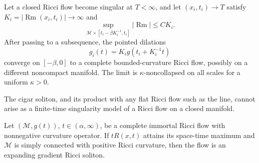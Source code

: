 \begin{corollary}
\label{cor:chow-ii-appd-obtaining-singularity-models}
Let a closed Ricci flow become singular at $T<\infty$, and let
$(x_i,t_i)\to T$ satisfy $K_i=|\operatorname{Rm}(x_i,t_i)|\to\infty$ and
\[
 \sup_{\mathcal M\times[t_i-\beta K_i^{-1},t_i]}
 |\operatorname{Rm}|\leq CK_i.
\]
After passing to a subsequence, the pointed dilations
\[
 g_i(t)=K_i g(t_i+K_i^{-1}t)
\]
converge on $[-\beta,0]$ to a complete bounded-curvature Ricci flow, possibly
on a different noncompact manifold. The limit is $\kappa$-noncollapsed on all
scales for a uniform $\kappa>0$.
\end{corollary}

\begin{corollary}
\label{cor:chow-ii-appd-cigar-not-singularity-model}
The cigar soliton, and its product with any flat Ricci flow such as the line,
cannot arise as a finite-time singularity model of a Ricci flow on a closed
manifold.
\end{corollary}

\begin{theorem}
\label{thm:chow-ii-appd-immortal-expanding-soliton}
Let $(\mathcal M,g(t))$, $t\in(\alpha,\infty)$, be a complete immortal Ricci
flow with nonnegative curvature operator. If $tR(x,t)$ attains its space-time
maximum and $\mathcal M$ is simply connected with positive Ricci curvature,
then the flow is an expanding gradient Ricci soliton.
\end{theorem}
